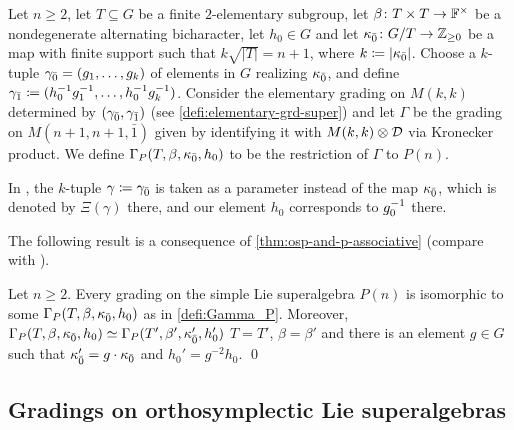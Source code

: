 \begin{defi}\label{defi:Gamma_P}
    Let $n\geq 2$, 
    let $T \subseteq G$ be a finite $2$-elementary subgroup, let $\beta\colon {T\times T} \to \mathbb{F}^\times$ be a nondegenerate alternating bicharacter, let $h_0 \in G$
    and let $\kappa_{\bar{0}}\colon G/T \to \mathbb{Z}_{\geq 0}$ be a map with finite support such that $k \sqrt{|T|} = n+1$, where $k \coloneqq |\kappa_{\bar{0}}|$. 
    Choose a $k$-tuple $\gamma_{\bar{0}} = (g_1, \ldots, g_k)$ of elements in $G$ realizing $\kappa_{\bar{0}}$, 
    and define $\gamma_{\bar{1}} \coloneqq (h_0^{-1} g_1^{-1}, \ldots, h_0^{-1} g_k^{-1})$. 
    Consider the elementary grading on $M(k,k)$ determined by $(\gamma_{\bar{0}}, \gamma_{\bar{1}})$ (see \cref{defi:elementary-grd-super}) and let $\Gamma$ be the grading on $M(n+1, n+1, \bar 1)$ given by identifying it with $M(k,k) \otimes \mathcal{D}$ via Kronecker product. 
    We define $\Gamma_P (T, \beta, \kappa_{\bar{0}}, h_0)$ to be the restriction of $\Gamma$ to $P(n)$. 
\end{defi}


\begin{remark}
    In \cite{paper-MAP}, the $k$-tuple $\gamma \coloneqq \gamma_{\bar{0}}$ is taken as a parameter instead of the map $\kappa_{\bar{0}}$, which is denoted by $\Xi (\gamma)$ there, and our element $h_0$ corresponds to $g_0^{-1}$ there. 
\end{remark}

The following result is a consequence of \cref{thm:osp-and-p-associative} (compare with \cite[Theorem 6.9]{paper-MAP}). 

\begin{thm}\label{thm:last-one-for-P}
    Let $n \geq 2$. 
    Every grading on the simple Lie superalgebra $P(n)$ is isomorphic to some $\Gamma_P (T, \beta, \kappa_{\bar{0}}, h_0)$ as in \cref{defi:Gamma_P}. 
    Moreover, $\Gamma_P (T, \beta, \kappa_{\bar{0}}, h_0) \simeq \Gamma_P (T', \beta', \kappa_{\bar{0}}', h_0')$ \IFF $T = T'$, $\beta = \beta'$ and there is an element $g\in G$ such that $\kappa_{\bar{0}}' = g \cdot \kappa_{\bar{0}}$ and $h_0' = g^{-2} h_0$. \qed 
\end{thm}


\subsection{Gradings on orthosymplectic Lie superalgebras}\label{ssec:grds-osp} 

